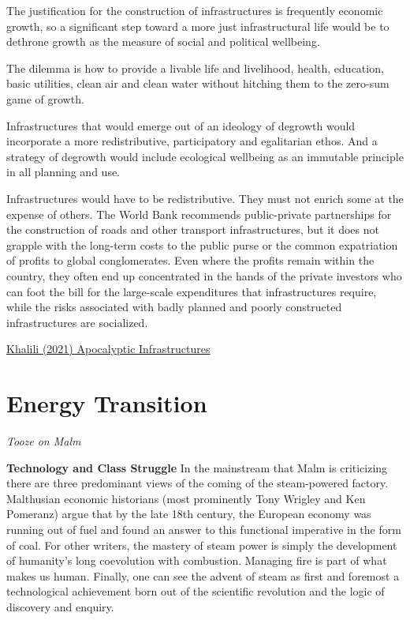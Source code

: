 \documentclass[
]{book}
\begin{document}
The justification for the construction of infrastructures is frequently economic growth, so a significant step toward a more just infrastructural life would be to dethrone growth as the measure of social and political wellbeing.

The dilemma is how to provide a livable life and livelihood, health, education, basic utilities, clean air and clean water without hitching them to the zero-sum game of growth.

Infrastructures that would emerge out of an ideology of degrowth would incorporate a more redistributive, participatory and egalitarian ethos. And a strategy of degrowth would include ecological wellbeing as an immutable principle in all planning and use.

Infrastructures would have to be redistributive. They must not enrich some at the expense of others. The World Bank recommends public-private partnerships for the construction of roads and other transport infrastructures, but it does not grapple with the long-term costs to the public purse or the common expatriation of profits to global conglomerates. Even where the profits remain within the country, they often end up concentrated in the hands of the private investors who can foot the bill for the large-scale expenditures that infrastructures require, while the risks associated with badly planned and poorly constructed infrastructures are socialized.

\href{https://www.noemamag.com/apocalyptic-infrastructures/}{Khalili (2021) Apocalyptic Infrastructures}

\hypertarget{energy-transition}{%
\section{Energy Transition}\label{energy-transition}}

\emph{Tooze on Malm}

\textbf{Technology and Class Struggle}
In the mainstream that Malm is criticizing there are three predominant views of the coming of the steam-powered factory. Malthusian economic historians (most prominently Tony Wrigley and Ken Pomeranz) argue that by the late 18th century, the European economy was running out of fuel and found an answer to this functional imperative in the form of coal. For other writers, the mastery of steam power is simply the development of humanity's long coevolution with combustion. Managing fire is part of what makes us human. Finally, one can see the advent of steam as first and foremost a technological achievement born out of the scientific revolution and the logic of discovery and enquiry.
\end{document}
